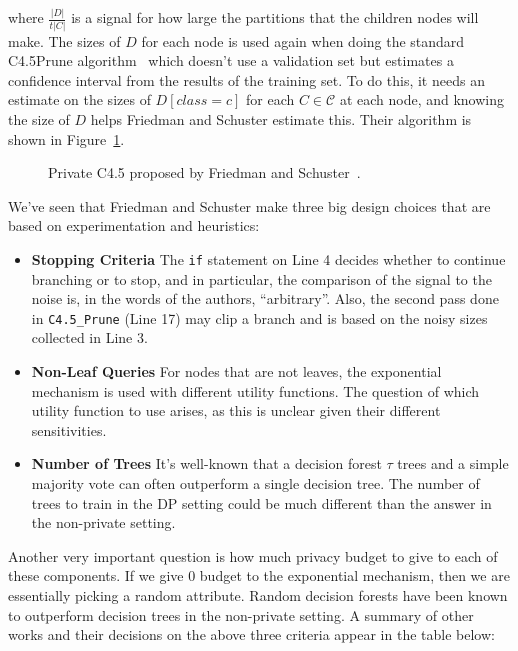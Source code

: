 \documentclass[11pt]{report}
\renewcommand{\t}[1]{\texttt{#1}}
\begin{document}
where $\frac{|D|}{t|C|}$ is a signal for how large the partitions that the children nodes will make. The sizes of $D$ for each node is used again when doing the standard C4.5Prune algorithm~\cite{Quinlan:1993} which doesn't use a validation set but estimates a confidence interval from the results of the training set. To do this, it needs an estimate on the sizes of $D[class=c]$ for each $C \in \mathcal{C}$ at each node, and knowing the size of $D$ helps Friedman and Schuster estimate this. Their algorithm is shown in Figure~\ref{alg:pc45}.
\begin{figure}

\caption{Private C4.5 proposed by Friedman and Schuster~\cite{Friedman:2010}. } \label{alg:pc45}
\end{figure}
We've seen that Friedman and Schuster make three big design choices that are based on experimentation and heuristics:
\begin{itemize}
\item \textbf{Stopping Criteria} The \t{if} statement on Line 4 decides whether to continue branching or to stop, and in particular, the comparison of the signal to the noise is, in the words of the authors, ``arbitrary''. Also, the second pass done in \t{C4.5\_Prune} (Line 17) may clip a branch and is based on the noisy sizes collected in Line 3. 
\item \textbf{Non-Leaf Queries} For nodes that are not leaves, the exponential mechanism is used with different utility functions. The question of which utility function to use arises, as this is unclear given their different sensitivities.
\item \textbf{Number of Trees} It's well-known that a decision forest $\tau$ trees and a simple majority vote can often outperform a single decision tree. The number of trees to train in the DP setting could be much different than the answer in the non-private setting.
\end{itemize}
Another very important question is how much privacy budget to give to each of these components. If we give $0$ budget to the exponential mechanism, then we are essentially picking a random attribute. Random decision forests have been known to outperform decision trees in the non-private setting.
A summary of other works and their decisions on the above three criteria appear in the table below:
\end{document}
